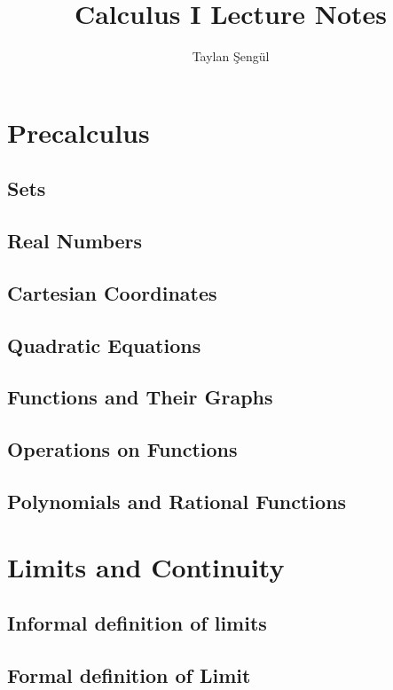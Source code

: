 \documentclass[12pt]{memoir}
\title{Calculus I Lecture Notes}
\author{Taylan Şengül}
\begin{document}
\maketitle
\tableofcontents
\chapter{Precalculus}
    \section{Sets}
    
    \section{Real Numbers}
    
    \section{Cartesian Coordinates}
    
    \section{Quadratic Equations}
    
    \section{Functions and Their Graphs}
    
    \section{Operations on Functions}
    
    \section{Polynomials and Rational Functions}
    


\chapter{Limits and Continuity}
    \section{Informal definition of limits}
    
    \section{Formal definition of Limit}
    
\end{document}
